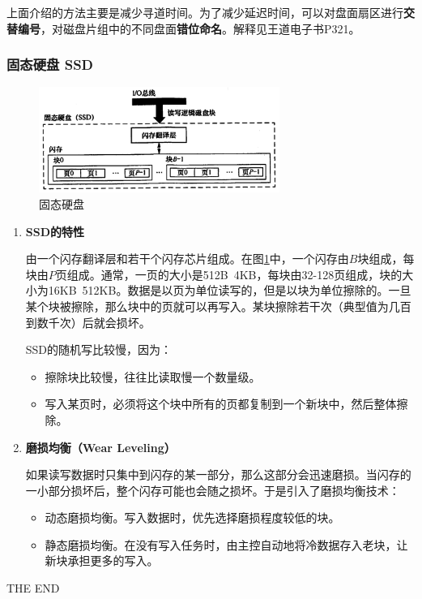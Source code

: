 \documentclass[12pt, a4paper, oneside]{ctexart}
\begin{document}
上面介绍的方法主要是减少寻道时间。为了减少延迟时间，可以对盘面扇区进行\textbf{交替编号}，对磁盘片组中的不同盘面\textbf{错位命名}。解释见王道电子书P321。

\subsubsection{固态硬盘 SSD}

\begin{figure}
  \centering
  \includegraphics[width=0.7\textwidth]{./images/ssd.png}
  \caption{固态硬盘}
  \label{ssd}
\end{figure}

\begin{enumerate}
  \item {\bf SSD的特性}
  
  由一个闪存翻译层和若干个闪存芯片组成。在图\ref{ssd}中，一个闪存由$B$块组成，每块由$P$页组成。通常，一页的大小是512B~4KB，每块由32-128页组成，块的大小为16KB~512KB。数据是以页为单位读写的，但是以块为单位擦除的。一旦某个块被擦除，那么块中的页就可以再写入。某块擦除若干次（典型值为几百到数千次）后就会损坏。

  SSD的随机写比较慢，因为：
  \begin{itemize}
    \item 擦除块比较慢，往往比读取慢一个数量级。
    \item 写入某页时，必须将这个块中所有的页都复制到一个新块中，然后整体擦除。
  \end{itemize}

  \item {\bf 磨损均衡（Wear Leveling）}
  
  如果读写数据时只集中到闪存的某一部分，那么这部分会迅速磨损。当闪存的一小部分损坏后，整个闪存可能也会随之损坏。于是引入了磨损均衡技术：
  \begin{itemize}
    \item 动态磨损均衡。写入数据时，优先选择磨损程度较低的块。
    \item 静态磨损均衡。在没有写入任务时，由主控自动地将冷数据存入老块，让新块承担更多的写入。
  \end{itemize}
\end{enumerate}

\vspace*{30pt}

\begin{center}
  \Large{THE END}
\end{center}
\end{document}
